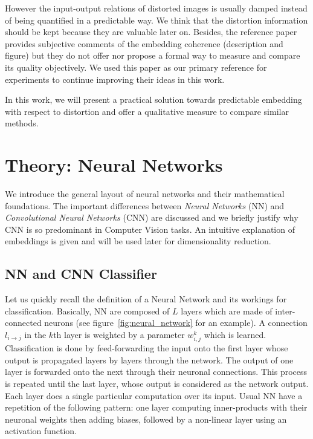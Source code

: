 \documentclass[a4paper,12pt]{report}
\begin{document}
However the input-output relations of distorted images is usually damped instead of being quantified in a predictable way.
We think that the distortion information should be kept because they are valuable later on.
Besides, the reference paper provides subjective comments of the embedding coherence (description and figure) but they do not offer nor propose a formal way to measure and compare its quality objectively.
We used this paper as our primary reference for experiments to continue improving their ideas in this work.

In this work, we will present a practical solution towards predictable embedding with respect to distortion and offer a qualitative measure to compare similar methods. %


\chapter{Theory: Neural Networks}
\label{chap:neural_network}
We introduce the general layout of neural networks and their mathematical foundations.
The important differences between {\em Neural Networks} (NN) and {\em Convolutional Neural Networks} (CNN) are discussed and we briefly justify why CNN is so predominant in Computer Vision tasks.
An intuitive explanation of embeddings is given and will be used later for dimensionality reduction.

\section{NN and CNN Classifier}

Let us quickly recall the definition of a Neural Network and its workings for classification.
Basically, NN are composed of $L$ layers which are made of inter-connected neurons (see figure~\ref{fig:neural_network} for an example).
A connection $l_{i \rightarrow j}$ in the $k$th layer is weighted by a parameter $w^k_{i,j}$ which is learned.
Classification is done by feed-forwarding the input onto the first layer whose output is propagated layers by layers through the network.
The output of one layer is forwarded onto the next through their neuronal connections.
This process is repeated until the last layer, whose output is considered as the network output.
Each layer does a single particular computation over its input.
Usual NN have a repetition of the following pattern: one layer computing inner-products with their neuronal weights then adding biases, followed by a non-linear layer using an activation function.
\end{document}
